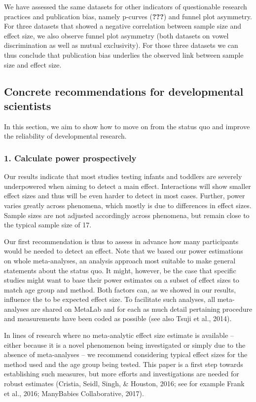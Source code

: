 \documentclass[english,floatsintext,man]{apa6}
\begin{document}
We have assessed the same datasets for other indicators of questionable
research practices and publication bias, namely p-curves
({\textbf{???}}) and funnel plot asymmetry. For three datasets that
showed a negative correlation between sample size and effect size, we
also observe funnel plot asymmetry (both datasets on vowel
discrimination as well as mutual exclusivity). For those three datasets
we can thus conclude that publication bias underlies the observed link
between sample size and effect size.

\subsection{Concrete recommendations for developmental
scientists}\label{concrete-recommendations-for-developmental-scientists}

In this section, we aim to show how to move on from the status quo and
improve the reliability of developmental research.

\subsubsection{1. Calculate power
prospectively}\label{calculate-power-prospectively}

Our results indicate that most studies testing infants and toddlers are
severely underpowered when aiming to detect a main effect. Interactions
will show smaller effect sizes and thus will be even harder to detect in
most cases. Further, power varies greatly across phenomena, which mostly
is due to differences in effect sizes. Sample sizes are not adjusted
accordingly across phenomena, but remain close to the typical sample
size of 17.

Our first recommendation is thus to assess in advance how many
participants would be needed to detect an effect. Note that we based our
power estimations on whole meta-analyses, an analysis approach most
suitable to make general statements about the status quo. It might,
however, be the case that specific studies might want to base their
power estimates on a subset of effect sizes to match age group and
method. Both factors can, as we showed in our results, influence the to
be expected effect size. To facilitate such analyses, all meta-analyses
are shared on MetaLab and for each as much detail pertaining procedure
and measurements have been coded as possible (see also Tsuji et al.,
2014).

In lines of research where no meta-analytic effect size estimate is
available -- either because it is a novel phenomenon being investigated
or simply due to the absence of meta-analyses -- we recommend
considering typical effect sizes for the method used and the age group
being tested. This paper is a first step towards establishing such
measures, but more efforts and investigations are needed for robust
estimates (Cristia, Seidl, Singh, \& Houston, 2016; see for example
Frank et al., 2016; ManyBabies Collaborative, 2017).
\end{document}
